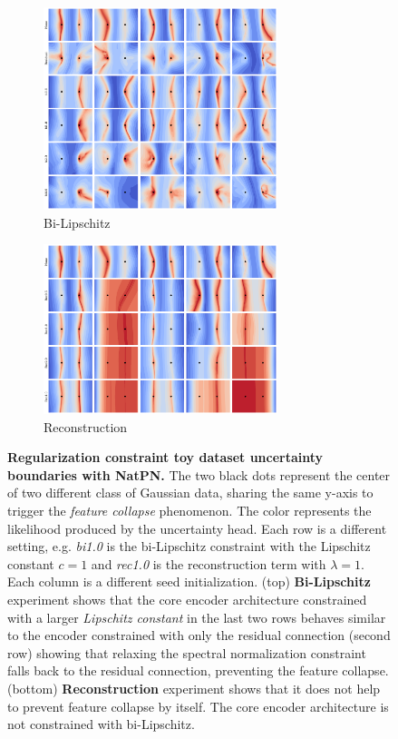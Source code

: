 \begin{figure}[!htb]
    \begin{subfigure}[b]{\textwidth}
        \centering
        \includegraphics[width=0.75\textwidth]{sections/008_iclr2023/figures/toy/blob2/bi.png}
        \caption{Bi-Lipschitz}
        \label{fig:bi_toy}
    \end{subfigure}
    \begin{subfigure}[b]{\textwidth}
        \centering
        \includegraphics[width=0.75\textwidth]{sections/008_iclr2023/figures/toy/blob2/rec.png}
        \caption{Reconstruction}
        \label{fig:rec_toy}
    \end{subfigure}
    \caption{\textbf{Regularization constraint toy dataset uncertainty boundaries with NatPN.} The two black dots represent the center of two different class of Gaussian data, sharing the same y-axis to trigger the \textit{feature collapse} phenomenon. The color represents the likelihood produced by the uncertainty head. Each row is a different setting, e.g. \textit{bi1.0} is the bi-Lipschitz constraint with the Lipschitz constant $c = 1$ and \textit{rec1.0} is the reconstruction term with $\lambda=1$. Each column is a different seed initialization. (top) \textbf{Bi-Lipschitz} experiment shows that the core encoder architecture constrained with a larger \textit{Lipschitz constant} in the last two rows behaves similar to the encoder constrained with only the residual connection (second row) showing that relaxing the spectral normalization constraint falls back to the residual connection, preventing the feature collapse. (bottom) \textbf{Reconstruction} experiment shows that it does not help to prevent feature collapse by itself. The core encoder architecture is not constrained with bi-Lipschitz. }

\end{figure}
